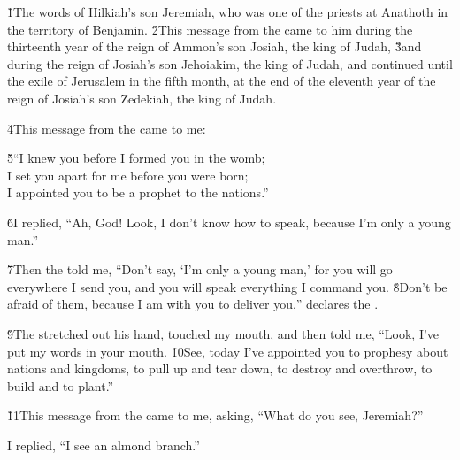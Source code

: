 


\v{1}The words of Hilkiah's son Jeremiah, who was one of the priests at Anathoth in the territory of Benjamin. \v{2}This message from the  came to him during the thirteenth year of the reign of Ammon's son Josiah, the king of Judah, \v{3}and during the reign of Josiah's son Jehoiakim, the king of Judah, and continued until the exile of Jerusalem in the fifth month, at the end of the eleventh year of the reign of Josiah's son Zedekiah, the king of Judah.

\v{4}This message from the  came to me:

\begin{poetry}
\poeml \v{5}``I knew you before I formed you in the womb; \\
\poemll    I set you apart for me before you were born; \\
\poemlll       I appointed you to be a prophet to the nations.''
\end{poetry}

\v{6}I replied, ``Ah,  God! Look, I don't know how to speak, because I'm only a young man.''

\v{7}Then the  told me, ``Don't say, `I'm only a young man,' for you will go everywhere I send you, and you will speak everything I command you. \v{8}Don't be afraid of them, because I am with you to deliver you,'' declares the .

\v{9}The  stretched out his hand, touched my mouth, and then told me, ``Look, I've put my words in your mouth. \v{10}See, today I've appointed you to prophesy about nations and kingdoms, to pull up and tear down, to destroy and overthrow, to build and to plant.''

\v{11}This message from the  came to me, asking, ``What do you see, Jeremiah?''

I replied, ``I see an almond branch.''


